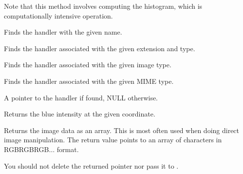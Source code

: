 
Note that this method involves computing the histogram, which is
computationally intensive operation.



Finds the handler with the given name.


Finds the handler associated with the given extension and type.


Finds the handler associated with the given image type.


Finds the handler associated with the given MIME type.






A pointer to the handler if found, NULL otherwise.



\label{wximagegetblue}


Returns the blue intensity at the given coordinate.

\label{wximagegetdata}


Returns the image data as an array. This is most often used when doing
direct image manipulation. The return value points to an array of
characters in RGBRGBRGB$\ldots$ format.

You should not delete the returned pointer nor pass it to
.


